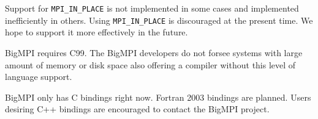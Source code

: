 Support for \texttt{MPI\_IN\_PLACE} is not implemented in some cases and
implemented inefficiently in others.
Using \texttt{MPI\_IN\_PLACE} is discouraged at the present time.
We hope to support it more effectively in the future.

BigMPI requires C99.  The BigMPI developers do not forsee systems with large
amount of memory or disk space also offering a compiler without this level of language support.

BigMPI only has C bindings right now.
Fortran 2003 bindings are planned.
Users desiring C++ bindings are encouraged to contact the BigMPI project.
